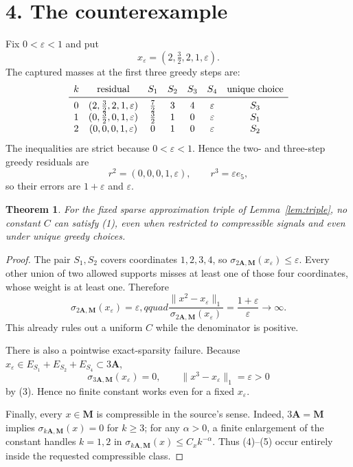 \documentclass[10pt]{article}
\newtheorem{theorem}{Theorem}
\newcommand{\A}{\mathbf A}
\newcommand{\M}{\mathbf M}
\newcommand{\sigmaerr}[2]{\sigma_{#1\A,\M}(#2)}
\begin{document}
\section*{4. The counterexample}

Fix $0<\varepsilon<1$ and put
\[
 x_\varepsilon=(2,\tfrac32,2,1,\varepsilon).
\]
The captured masses at the first three greedy steps are:
\[
\begin{array}{c@{\quad}c@{\quad}cccc@{\quad}c}
 k & \text{residual} & S_1&S_2&S_3&S_4&\text{unique choice}\\
\midrule
0&(2,\frac32,2,1,\varepsilon)&\frac72&3&4&\varepsilon&S_3\\
1&(0,\frac32,0,1,\varepsilon)&\frac32&1&0&\varepsilon&S_1\\
2&(0,0,0,1,\varepsilon)&0&1&0&\varepsilon&S_2
\end{array}
\]
The inequalities are strict because $0<\varepsilon<1$.  Hence the two- and
three-step greedy residuals are
\[
 r^2=(0,0,0,1,\varepsilon),\qquad
 r^3=\varepsilon e_5,                                   \tag{3}
\]
so their errors are $1+\varepsilon$ and $\varepsilon$.

\begin{theorem}\label{thm:main}
For the fixed sparse approximation triple of Lemma~\ref{lem:triple}, no
constant $C$ can satisfy (1), even when restricted to compressible signals
and even under unique greedy choices.
\end{theorem}

\begin{proof}
The pair $S_1,S_2$ covers coordinates $1,2,3,4$, so
$\sigmaerr{2}{x_\varepsilon}\leq\varepsilon$.  Every other union of two
allowed supports misses at least one of those four coordinates, whose weight
is at least one.  Therefore
\[
 \sigmaerr{2}{x_\varepsilon}=\varepsilon,qquad
 \frac{\|x^2-x_\varepsilon\|_1}{\sigmaerr{2}{x_\varepsilon}}
 =\frac{1+\varepsilon}{\varepsilon}\longrightarrow\infty.   \tag{4}
\]
This already rules out a uniform $C$ while the denominator is positive.

There is also a pointwise exact-sparsity failure.  Because
$x_\varepsilon\in E_{S_1}+E_{S_2}+E_{S_4}\subset3\A$,
\[
 \sigmaerr{3}{x_\varepsilon}=0,
 \qquad \|x^3-x_\varepsilon\|_1=\varepsilon>0              \tag{5}
\]
by (3).  Hence no finite constant works even for a fixed $x_\varepsilon$.

Finally, every $x\in\M$ is compressible in the source's sense.  Indeed,
$3\A=\M$ implies $\sigmaerr{k}{x}=0$ for $k\geq3$; for any $\alpha>0$, a
finite enlargement of the constant handles $k=1,2$ in
$\sigmaerr{k}{x}\leq C_xk^{-\alpha}$.  Thus (4)--(5) occur entirely inside
the requested compressible class.
\end{proof}
\end{document}
